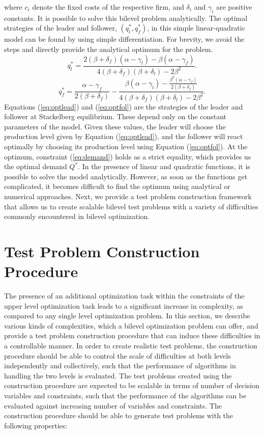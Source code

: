 \documentclass[twoside]{article}
\begin{document}
where $c_i$ denote the fixed costs of the respective firm, and $\delta_i$ and $\gamma_i$ are positive constants. It is possible to solve this bilevel problem analytically. The optimal strategies of the leader and follower, $(q_l^*,q_f^*)$, in this simple linear-quadratic model can be found by using simple differentiation. For brevity, we avoid the steps and directly provide the analytical optimum for the problem.
\begin{equation}
	q_l^* = \frac{2(\beta + \delta_f)(\alpha - \gamma_l) - \beta(\alpha - \gamma_f)}{4(\beta + \delta_f)(\beta + \delta_l) - 2\beta^2}. \label{eq:optlead}
\end{equation}
\begin{equation}
	q_f^* = \frac{\alpha - \gamma_f}{2(\beta + \delta_f)} - \frac{\beta(\alpha - \gamma_l)-{\displaystyle \frac{\beta^2(\alpha - \gamma_f)}{2(\beta + \delta_f)}}}{4(\beta + \delta_f)(\beta + \delta_l) - 2\beta^2}. \label{eq:optfol}
\end{equation}
Equations (\ref{eq:optlead}) and (\ref{eq:optfol}) are the strategies of the leader and follower at Stackelberg equilibrium. These depend only on the constant parameters of the model. Given these values, the leader will choose the production level given by Equation (\ref{eq:optlead}), and the follower will react optimally by choosing its production level using Equation (\ref{eq:optfol}). At the optimum, constraint (\ref{eq:demand}) holds as a strict equality, which provides us the optimal demand $Q^*$. In the presence of linear and quadratic functions, it is possible to solve the model analytically. However, as soon as the functions get complicated, it becomes difficult to find the optimum using analytical or numerical approaches. Next, we provide a test problem construction framework that allows us to create scalable bilevel test problems with a variety of difficulties commonly encountered in bilevel optimization.

\section{Test Problem Construction Procedure}\label{sec:framework}
The presence of an additional optimization task within the constraints of the upper level optimization task leads to a significant increase in complexity, as compared to any single level optimization problem. In this section, we describe various kinds of complexities, which a bilevel optimization problem can offer, and provide a test problem construction procedure that can induce these difficulties in a controllable manner. In order to create realistic test problems, the construction procedure should be able to control the scale of difficulties at both levels independently and collectively, such that the performance of algorithms in handling the two levels is evaluated. The test problems created using the construction procedure are expected to be scalable in terms of number of decision variables and constraints, such that the performance of the algorithms can be evaluated against increasing number of variables and constraints. The construction procedure should be able to generate test problems with the following properties:
\end{document}
